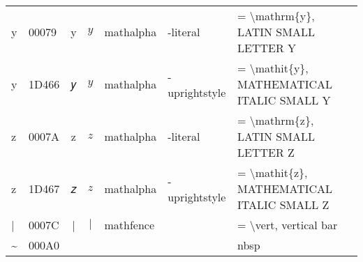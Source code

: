 \documentclass[a4paper,landscape]{article}
\begin{document}
\begin{longtable}{llcclll}
y & 00079 & y & $y$ & mathalpha & -literal & = \textbackslash{}mathrm\{y\}, LATIN SMALL LETTER Y \\
y & 1D466 & 𝑦 & $y$ & mathalpha & -uprightstyle & = \textbackslash{}mathit\{y\}, MATHEMATICAL ITALIC SMALL Y \\
z & 0007A & z & $z$ & mathalpha & -literal & = \textbackslash{}mathrm\{z\}, LATIN SMALL LETTER Z \\
z & 1D467 & 𝑧 & $z$ & mathalpha & -uprightstyle & = \textbackslash{}mathit\{z\}, MATHEMATICAL ITALIC SMALL Z \\
| & 0007C & | & $|$ & mathfence &  & = \textbackslash{}vert, vertical bar \\
\textasciitilde{} & 000A0 &   & $~$ &  &  & nbsp \\

\bottomrule
\end{longtable}
\end{document}
